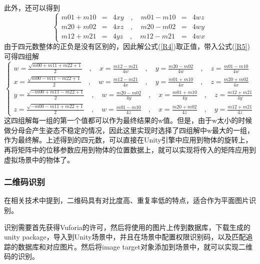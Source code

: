 此外，还可以得到
\begin{equation}\label{R5}
\left\{
\begin{aligned}
m01 + m10 &=& 4xy  \quad\mathrm{,}\quad m01 - m10 &=& 4wz \\
m20 + m02 &=& 4xz  \quad\mathrm{,}\quad m20 - m02 &=& 4wy \\
m12 + m21 &=& 4yz  \quad\mathrm{,}\quad m12 - m21 &=& 4wx 
\end{aligned}
\right.
\end{equation}
由于四元数整体的正负是没有区别的，因此解公式(\ref{R4})取正值，带入公式(\ref{R5})可得四组解
\begin{equation}\label{R6}
\left\{
\begin{aligned}
w=\frac{\sqrt{m00 + m11 + m22 + 1}}{2} \quad\mathrm{,}\quad x = \frac{m12 - m21}{4w} \quad\mathrm{,}\quad y = \frac{m20 - m02}{4w} \quad\mathrm{,}\quad z = \frac{m01 - m10}{4w}\\
x=\frac{\sqrt{m00 - m11 - m22 + 1}}{2} \quad\mathrm{,}\quad w = \frac{m12 - m21}{4x} \quad\mathrm{,}\quad y = \frac{m01 + m10}{4x} \quad\mathrm{,}\quad z = \frac{m20 + m02}{4x}\\
y=\frac{\sqrt{-m00 + m11 - m22 + 1}}{2} \quad\mathrm{,}\quad w = \frac{m20 - m02}{4y} \quad\mathrm{,}\quad x = \frac{m01 + m10}{4y} \quad\mathrm{,}\quad z = \frac{m12 + m21}{4y}\\
z=\frac{\sqrt{-m00 - m11 + m22 + 1}}{2} \quad\mathrm{,}\quad w = \frac{m01 - m10}{4z} \quad\mathrm{,}\quad x = \frac{m20 + m02}{4z} \quad\mathrm{,}\quad y = \frac{m12 + m21}{4z}
\end{aligned}
\right.
\end{equation}
这四组解每一组的第一个值都可以作为最终结果的w值。但是，由于w太小的时候做分母会产生姿态不稳定的情况\cite{akenine2018real}，因此这里实现时选择了四组解中w最大的一组，作为最终解。上述得到的四元数，可以直接在Unity引擎中应用到物体的旋转上，再将矩阵中的位移参数应用到物体的位置数据上，就可以实现将传入的矩阵应用到虚拟场景中的物体了。

\subsubsection{二维码识别}
在相关技术中提到，二维码具有对比度高、重复率低的特点，适合作为平面图片识别。

识别需要首先获得Vuforia的许可，然后将使用的图片上传到数据库，下载生成的unity package，导入到Unity场景中，并且在场景中配置权限识别码，以及匹配追踪的数据库和对应图片。然后将image target对象添加到场景中，就可以实现二维码的识别。

